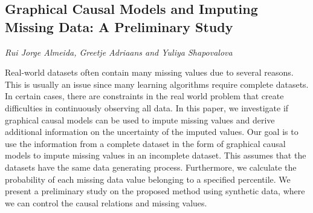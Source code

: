 \documentclass[../booklet.tex]{subfiles}
\begin{document}
\subsection[Graphical Causal Models and Imputing Missing Data: A Preliminary Study. {\it Rui Jorge Almeida, Greetje Adriaans and Yuliya Shapovalova}]{Graphical Causal Models and Imputing Missing Data: A Preliminary Study}
  

\begin{center}
  {\it Rui Jorge Almeida, Greetje Adriaans and Yuliya Shapovalova}
\end{center}

\vskip 0.8cm


Real-world datasets often contain many missing values due to several reasons. This is usually an issue since many learning algorithms require complete datasets. In certain cases, there are constraints in the real world problem that create difficulties in continuously observing all data. In this paper, we investigate if graphical causal models can be used to impute missing values and derive additional information on the uncertainty of the imputed values. Our goal is to use the information from a complete dataset in the form of graphical causal models to impute missing values in an incomplete dataset. This assumes that the datasets have the same data generating process. Furthermore, we calculate the probability of each missing data value belonging to a specified percentile. We present a preliminary study on the proposed method using synthetic data, where we can control the causal relations and missing values.
\end{document}
